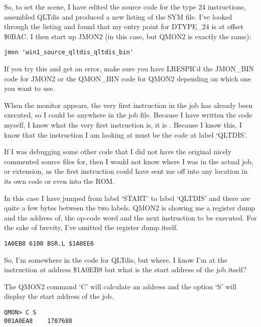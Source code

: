 \begin{appendix}
So, to set the scene, I have edited the source code for the type 24
instructions, assembled QLTdis and produced a new listing of the
SYM file. I've looked through the listing and found that my entry point for
DTYPE\_24 is at offset \$0BAC. I then start up JMON2 (in this case, but QMON2 is
exactly the same):

\begin{lstlisting}[firstnumber=1,caption={Debugging QLTdis with Jmon2}]
jmon 'win1_source_qltdis_qltdis_bin'
\end{lstlisting}

If you try this and get an error, make sure you have LRESPR'd the JMON\_BIN code
for JMON2 or the QMON\_BIN code for QMON2 depending on which one you want to use.

When the monitor appears, the very first instruction in the job has already been
executed, so I could be anywhere in the job file. Because I have written the
code myself, I know what the very first instruction is, it is .
Because I know this, I know that the instruction I am looking at must be the
code at label `QLTDIS'.

If I was debugging some other code that I did not have the original nicely
commented source files for, then I would not know where I was in the actual job,
or extension, as the first instruction could have sent me off into any location
in its own code or even into the ROM.

In this case I have jumped from label `START' to label `QLTDIS' and there are
quite a few bytes between the two labels. QMON2 is showing me a register dump and
the address of, the op-{}code word and the next instruction to be executed. For
the sake of brevity, I've omitted the register dump itself.

\begin{lstlisting}[frame=none,numbers=none,]
1A0EB8 6100 BSR.L $1A0EE6
\end{lstlisting}

So, I'm somewhere in the code for QLTdis, but where. I know I'm at the
instruction at address \$1A0EB8 but what is the start address of the job itself?

The QMON2 command `C' will calculate an address and the option `S' will display
the start address of the job.

\begin{lstlisting}[frame=none,numbers=none,]
QMON> C S
001A0EA8    1707688
\end{lstlisting}


\end{appendix}
